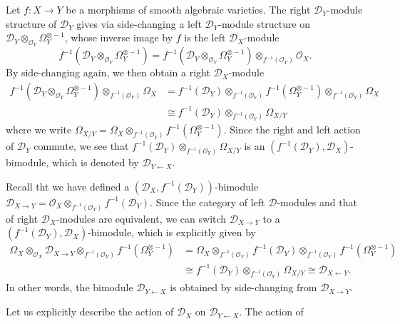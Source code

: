 Let $f:X\to Y$ be a morphisms of smooth algebraic varieties. The right $\mathscr{D}_Y$-module structure of $\mathscr{D}_Y$ gives via side-changing a left $\mathscr{D}_Y$-module structure on $\mathscr{D}_Y\otimes_{\mathscr{O}_Y}\Omega_Y^{\otimes-1}$, whose inverse image by $f$ is the left $\mathscr{D}_X$-module
\[f^{-1}(\mathscr{D}_Y\otimes_{\mathscr{O}_Y}\Omega_Y^{\otimes-1})=f^{-1}(\mathscr{D}_Y\otimes_{\mathscr{O}_Y}\Omega_Y^{\otimes-1})\otimes_{f^{-1}(\mathscr{O}_Y)}\mathscr{O}_X.\]
By side-changing again, we then obtain a right $\mathscr{D}_X$-module
\begin{align*}
f^{-1}(\mathscr{D}_Y\otimes_{\mathscr{O}_Y}\Omega_Y^{\otimes-1})\otimes_{f^{-1}(\mathscr{O}_Y)}\Omega_X&=f^{-1}(\mathscr{D}_Y)\otimes_{f^{-1}(\mathscr{O}_Y)}f^{-1}(\Omega_Y^{\otimes-1})\otimes_{f^{-1}(\mathscr{O}_Y)}\Omega_X\\
&\cong f^{-1}(\mathscr{D}_Y)\otimes_{f^{-1}(\mathscr{O}_Y)}\Omega_{X/Y}
\end{align*}
where we write $\Omega_{X/Y}=\Omega_X\otimes_{f^{-1}(\mathscr{O}_Y)}f^{-1}(\Omega_Y^{\otimes-1})$. Since the right and left action of $\mathscr{D}_Y$ commute, we see that $f^{-1}(\mathscr{D}_Y)\otimes_{f^{-1}(\mathscr{O}_Y)}\Omega_{X/Y}$ is an $(f^{-1}(\mathscr{D}_Y),\mathscr{D}_X)$-bimodule, which is denoted by $\mathscr{D}_{Y\leftarrow X}$.\par

Recall tht we have defined a $(\mathscr{D}_X,f^{-1}(\mathscr{D}_Y))$-bimodule $\mathscr{D}_{X\to Y}=\mathscr{O}_X\otimes_{f^{-1}(\mathscr{O}_Y)}f^{-1}(\mathscr{D}_Y)$. Since the category of left $\mathscr{D}$-modules and that of right $\mathscr{D}_X$-modules are equivalent, we can switch $\mathscr{D}_{X\to Y}$ to a $(f^{-1}(\mathscr{D}_Y),\mathscr{D}_X)$-bimodule, which is explicitly given by
\begin{align*}
\Omega_X\otimes_{\mathscr{O}_X}\mathscr{D}_{X\to Y}\otimes_{f^{-1}(\mathscr{O}_Y)}f^{-1}(\Omega_Y^{\otimes-1})&=\Omega_X\otimes_{f^{-1}(\mathscr{O}_Y)}f^{-1}(\mathscr{D}_Y)\otimes_{f^{-1}(\mathscr{O}_Y)}f^{-1}(\Omega_Y^{\otimes-1})\\
&\cong f^{-1}(\mathscr{D}_Y)\otimes_{f^{-1}(\mathscr{O}_Y)}\Omega_{X/Y}\cong\mathscr{D}_{X\leftarrow Y}.
\end{align*}
In other words, the bimodule $\mathscr{D}_{Y\leftarrow X}$ is obtained by side-changing from $\mathscr{D}_{X\to Y}$.\par 

Let us explicitly describe the action of $\mathscr{D}_X$ on $\mathscr{D}_{Y\leftarrow X}$. The action of 